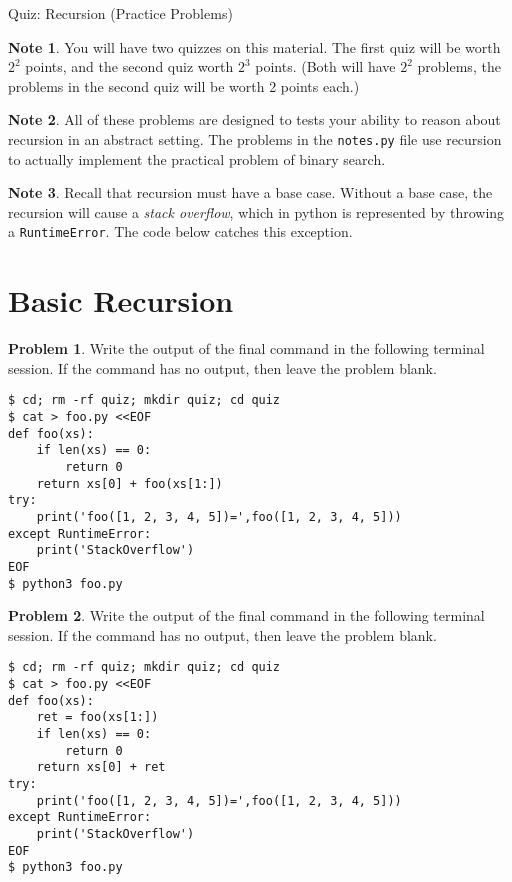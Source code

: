 \documentclass[10pt]{article}
\theoremstyle{definition}
\newtheorem{problem}{Problem}
\newtheorem{note}{Note}
\begin{document}
\begin{center}
    {
\Large
    Quiz: Recursion (Practice Problems)
}

    \vspace{0.1in}
\end{center}

\begin{note}
    You will have two quizzes on this material.
    The first quiz will be worth $2^2$ points,
    and the second quiz worth $2^3$ points.
    (Both will have $2^2$ problems,
    the problems in the second quiz will be worth 2 points each.)
\end{note}

\begin{note}
    All of these problems are designed to tests your ability to reason about recursion in an abstract setting.
    The problems in the \texttt{notes.py} file use recursion to actually implement the practical problem of binary search.
\end{note}

\begin{note}
    Recall that recursion must have a base case.
    Without a base case, the recursion will cause a \emph{stack overflow},
    which in python is represented by throwing a \texttt{RuntimeError}.
    The code below catches this exception.
\end{note}

\filbreak
\section{Basic Recursion}

\begin{problem}
    Write the output of the final command in the following terminal session.
    If the command has no output, then leave the problem blank.
\end{problem}
\begin{lstlisting}
$ cd; rm -rf quiz; mkdir quiz; cd quiz
$ cat > foo.py <<EOF
def foo(xs):
    if len(xs) == 0:
        return 0
    return xs[0] + foo(xs[1:])
try:
    print('foo([1, 2, 3, 4, 5])=',foo([1, 2, 3, 4, 5]))
except RuntimeError:
    print('StackOverflow')
EOF
$ python3 foo.py
\end{lstlisting}

\begin{problem}
    Write the output of the final command in the following terminal session.
    If the command has no output, then leave the problem blank.
\end{problem}
\begin{lstlisting}
$ cd; rm -rf quiz; mkdir quiz; cd quiz
$ cat > foo.py <<EOF
def foo(xs):
    ret = foo(xs[1:])
    if len(xs) == 0:
        return 0
    return xs[0] + ret
try:
    print('foo([1, 2, 3, 4, 5])=',foo([1, 2, 3, 4, 5]))
except RuntimeError:
    print('StackOverflow')
EOF
$ python3 foo.py
\end{lstlisting}
\end{document}
